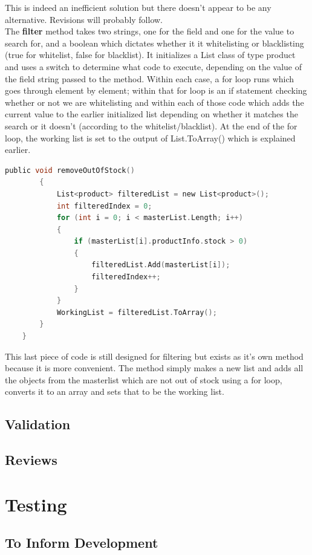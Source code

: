 ﻿\documentclass{article}
\begin{document}
    This is indeed an inefficient solution but there doesn't appear to be any alternative.
    Revisions will probably follow.
    \\
    The \textbf{filter} method takes two strings, one for the field and one for the value to search for, and a boolean which dictates whether it it whitelisting or blacklisting (true for whitelist, false for blacklist).
    It initializes a List class of type product and uses a switch to determine what code to execute, depending on the value of the field string passed to the method.
    Within each case, a for loop runs which goes through element by element; within that for loop is an if statement checking whether or not we are whitelisting and within each of those code which adds the current value to the earlier initialized list depending on whether it matches the search or it doesn't (according to the whitelist/blacklist).
    At the end of the for loop, the working list is set to the output of List.ToArray() which is explained earlier.
    \begin{lstlisting}[language=C]
		public void removeOutOfStock()
		{
			List<product> filteredList = new List<product>();
			int filteredIndex = 0;
			for (int i = 0; i < masterList.Length; i++)
			{
				if (masterList[i].productInfo.stock > 0)
				{
					filteredList.Add(masterList[i]);
					filteredIndex++;
				}
			}
			WorkingList = filteredList.ToArray();
		}
    }
    \end{lstlisting}
    This last piece of code is still designed for filtering but exists as it's own method because it is more convenient.
    The method simply makes a new list and adds all the objects from the masterlist which are not out of stock using a for loop, converts it to an array and sets that to be the working list.
    \subsection{Validation}
    \subsection{Reviews}
    
    
    \section{Testing}
    \subsection{To Inform Development}
\end{document}
